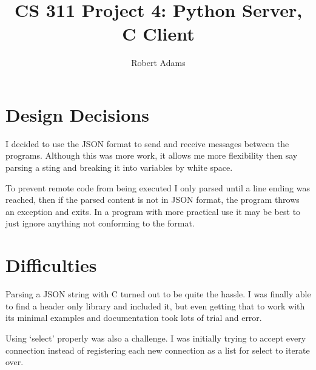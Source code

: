 \documentclass[letterpaper,10pt]{article} %
\begin{document}
  \title{CS 311 Project 4: Python Server, C Client}
  \author{Robert Adams}
\maketitle


\section{Design Decisions}


	I decided to use the JSON format to send and receive messages between the programs.
    Although this was more work, it allows me more flexibility then say parsing a sting 
    and breaking it into variables by white space. 


	To prevent remote code from being executed I only parsed until a
    line ending was reached, then if the parsed content is not in 
    JSON format, the program throws an exception and exits.  
    In a program with more practical use it may be best to just 
    ignore anything not conforming to the format.
	

\section{Difficulties}


	Parsing a JSON string with C turned out to be quite the hassle.
    I was finally able to find a header only library and included it,
    but even getting that to work with its minimal examples and 
    documentation took lots of trial and error.


	Using ‘select’ properly was also a challenge. I was
    initially trying to accept every connection instead of registering
    each new connection as a list for select to iterate over. 
\end{document}
